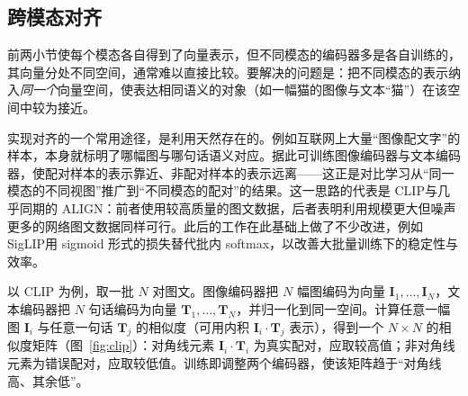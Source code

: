 \subsection{跨模态对齐}
\label{sub:align}

前两小节使每个模态各自得到了向量表示，但不同模态的编码器多是各自训练的，其向量分处不同空间，通常难以直接比较。要解决的问题是：把不同模态的表示纳入\emph{同一个}向量空间，使表达相同语义的对象（如一幅猫的图像与文本“猫”）在该空间中较为接近。

实现对齐的一个常用途径，是利用天然存在的。例如互联网上大量“图像配文字”的样本，本身就标明了哪幅图与哪句话语义对应。据此可训练图像编码器与文本编码器，使配对样本的表示靠近、非配对样本的表示远离——这正是对比学习从“同一模态的不同视图”推广到“不同模态的配对”的结果。这一思路的代表是 CLIP\cite{clip}与几乎同期的 ALIGN\cite{align}：前者使用较高质量的图文数据，后者表明利用规模更大但噪声更多的网络图文数据同样可行。此后的工作在此基础上做了不少改进，例如 SigLIP\cite{siglip}用 sigmoid 形式的损失替代批内 softmax，以改善大批量训练下的稳定性与效率。

以 CLIP 为例，取一批 $N$ 对图文。图像编码器把 $N$ 幅图编码为向量 $\mathbf{I}_1,\dots,\mathbf{I}_N$，文本编码器把 $N$ 句话编码为向量 $\mathbf{T}_1,\dots,\mathbf{T}_N$，并归一化到同一空间。计算任意一幅图 $\mathbf{I}_i$ 与任意一句话 $\mathbf{T}_j$ 的相似度（可用内积 $\mathbf{I}_i\cdot\mathbf{T}_j$ 表示），得到一个 $N\times N$ 的相似度矩阵（图~\ref{fig:clip}）：对角线元素 $\mathbf{I}_i\cdot\mathbf{T}_i$ 为真实配对，应取较高值；非对角线元素为错误配对，应取较低值。训练即调整两个编码器，使该矩阵趋于“对角线高、其余低”。

